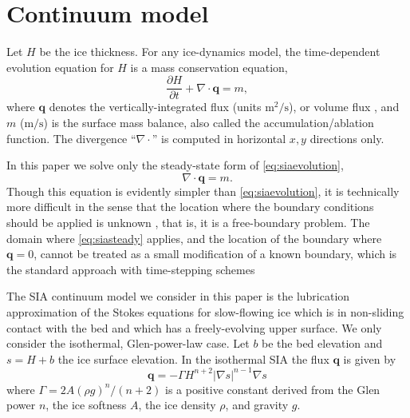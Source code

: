 \documentclass[twocolumn]{igs}
\newcommand\bq{\mathbf{q}}
\newcommand{\Div}{\nabla\cdot}
\newcommand{\grad}{\nabla}
\begin{document}
\section*{Continuum model}

Let $H$ be the ice thickness.  For any ice-dynamics model, the time-dependent evolution equation for $H$ is a mass conservation equation,
\begin{equation}
\frac{\partial H}{\partial t} + \Div \bq = m,  \label{eq:siaevolution}
\end{equation}
where $\bq$ denotes the vertically-integrated flux (units $\text{m}^2/\text{s}$), or volume flux \cite{GreveBlatter2009}, and $m$ ($\text{m}/\text{s}$) is the surface mass balance, also called the accumulation/ablation function.  The divergence ``$\Div$'' is computed in horizontal $x,y$ directions only.

In this paper we solve only the steady-state form of \eqref{eq:siaevolution},
\begin{equation}
\Div \bq = m.  \label{eq:siasteady}
\end{equation}
Though this equation is evidently simpler than \eqref{eq:siaevolution}, it is technically more difficult in the sense that the location where the boundary conditions should be applied is unknown \citep{JaroschSchoofAnslow2013,JouvetBueler2012}, that is, it is a free-boundary problem.  The domain where \eqref{eq:siasteady} applies, and the location of the boundary where $\bq=0$, cannot be treated as a small modification of a known boundary, which is the standard approach with time-stepping schemes \citep{Bueleretal2005,Huybrechtsetal1996}

The SIA continuum model we consider in this paper is the lubrication approximation \citep{Fowler1997} of the Stokes equations for slow-flowing ice which is in non-sliding contact with the bed and which has a freely-evolving upper surface.  We only consider the isothermal, Glen-power-law \citep{GreveBlatter2009} case.  Let $b$ be the bed elevation and $s = H+b$ the ice surface elevation.  In the isothermal SIA the flux $\bq$ is given by
\begin{equation}
\bq = - \Gamma H^{n+2} |\grad s|^{n-1} \grad s  \label{eq:siaflux}
\end{equation}
where $\Gamma = 2 A (\rho g)^n / (n+2)$ is a positive constant derived from the Glen power $n$, the ice softness $A$, the ice density $\rho$, and gravity $g$.
\end{document}
